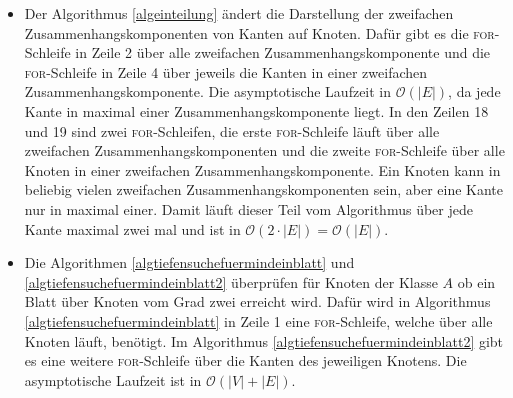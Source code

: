 \begin{bem}
\begin{itemize}
\item Der Algorithmus \ref{algeinteilung} ändert die Darstellung der zweifachen Zusammenhangskomponenten von Kanten auf Knoten. Dafür gibt es die \textsc{for}-Schleife in Zeile 2 über alle zweifachen Zusammenhangskomponente und die \textsc{for}-Schleife in Zeile 4 über jeweils die Kanten in einer zweifachen Zusammenhangskomponente. Die  asymptotische Laufzeit in $\mathcal{O}(|E|)$, da jede Kante in maximal einer Zusammenhangskomponente liegt. In den Zeilen 18 und 19 sind zwei \textsc{for}-Schleifen, die erste \textsc{for}-Schleife läuft über alle zweifachen Zusammenhangskomponenten und die zweite \textsc{for}-Schleife über alle Knoten in einer zweifachen Zusammenhangskomponente. Ein Knoten kann in beliebig vielen zweifachen Zusammenhangskomponenten sein, aber eine Kante nur in maximal einer. Damit läuft dieser Teil vom Algorithmus über jede Kante maximal zwei mal und ist in $\mathcal{O}(2 \cdot |E|)=\mathcal{O}(|E|)$.
\item Die Algorithmen \ref{algtiefensuchefuermindeinblatt} und \ref{algtiefensuchefuermindeinblatt2} überprüfen für Knoten der Klasse $A$ ob ein Blatt über Knoten vom Grad zwei erreicht wird. Dafür wird in Algorithmus \ref{algtiefensuchefuermindeinblatt} in Zeile 1 eine \textsc{for}-Schleife, welche über alle Knoten läuft, benötigt.
Im Algorithmus \ref{algtiefensuchefuermindeinblatt2} gibt es eine weitere \textsc{for}-Schleife über die Kanten des jeweiligen Knotens. Die asymptotische Laufzeit ist in $\mathcal{O}(|V|+|E|)$.
\end{itemize}
\end{bem}
\newpage
